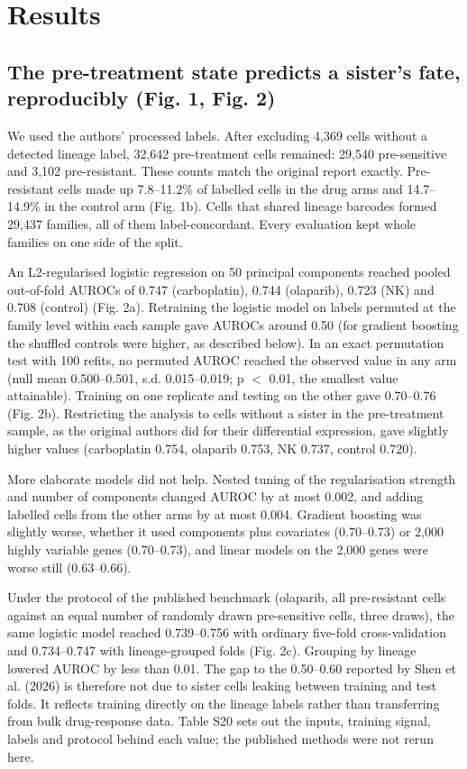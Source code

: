 \documentclass[11pt,a4paper]{article}
\begin{document}
\section*{Results}

\subsection*{The pre-treatment state predicts a sister's fate, reproducibly (Fig. 1, Fig. 2)}

We used the authors' processed labels. After excluding 4,369 cells without a detected lineage label, 32,642 pre-treatment cells remained: 29,540 pre-sensitive and 3,102 pre-resistant. These counts match the original report exactly. Pre-resistant cells made up 7.8--11.2\% of labelled cells in the drug arms and 14.7--14.9\% in the control arm (Fig. 1b). Cells that shared lineage barcodes formed 29,437 families, all of them label-concordant. Every evaluation kept whole families on one side of the split.

An L2-regularised logistic regression on 50 principal components reached pooled out-of-fold AUROCs of 0.747 (carboplatin), 0.744 (olaparib), 0.723 (NK) and 0.708 (control) (Fig. 2a). Retraining the logistic model on labels permuted at the family level within each sample gave AUROCs around 0.50 (for gradient boosting the shuffled controls were higher, as described below). In an exact permutation test with 100 refits, no permuted AUROC reached the observed value in any arm (null mean 0.500--0.501, s.d. 0.015--0.019; p $<$ 0.01, the smallest value attainable). Training on one replicate and testing on the other gave 0.70--0.76 (Fig. 2b). Restricting the analysis to cells without a sister in the pre-treatment sample, as the original authors did for their differential expression, gave slightly higher values (carboplatin 0.754, olaparib 0.753, NK 0.737, control 0.720).

More elaborate models did not help. Nested tuning of the regularisation strength and number of components changed AUROC by at most 0.002, and adding labelled cells from the other arms by at most 0.004. Gradient boosting was slightly worse, whether it used components plus covariates (0.70--0.73) or 2,000 highly variable genes (0.70--0.73), and linear models on the 2,000 genes were worse still (0.63--0.66).

Under the protocol of the published benchmark (olaparib, all pre-resistant cells against an equal number of randomly drawn pre-sensitive cells, three draws), the same logistic model reached 0.739--0.756 with ordinary five-fold cross-validation and 0.734--0.747 with lineage-grouped folds (Fig. 2c). Grouping by lineage lowered AUROC by less than 0.01. The gap to the 0.50--0.60 reported by Shen et al. (2026) is therefore not due to sister cells leaking between training and test folds. It reflects training directly on the lineage labels rather than transferring from bulk drug-response data. Table S20 sets out the inputs, training signal, labels and protocol behind each value; the published methods were not rerun here.
\end{document}
